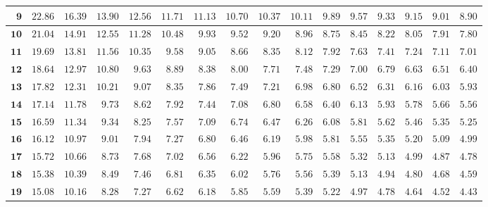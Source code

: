 \begin{alternateColorTable}
\begin{longtable}{|r|r|r|r|r|r|r|r|r|r|r|r|r|r|r|r|}
    \(\mathbf{9}\) & \(22.86\) & \(16.39\) & \(13.90\) & \(12.56\) & \(11.71\) & \(11.13\) & \(10.70\) & \(10.37\) & \(10.11\) & \(9.89\) & \(9.57\) & \(9.33\) & \(9.15\) & \(9.01\) & \(8.90\) \\ \hline 
    \(\mathbf{10}\) & \(21.04\) & \(14.91\) & \(12.55\) & \(11.28\) & \(10.48\) & \(9.93\) & \(9.52\) & \(9.20\) & \(8.96\) & \(8.75\) & \(8.45\) & \(8.22\) & \(8.05\) & \(7.91\) & \(7.80\) \\ \hline 
    \(\mathbf{11}\) & \(19.69\) & \(13.81\) & \(11.56\) & \(10.35\) & \(9.58\) & \(9.05\) & \(8.66\) & \(8.35\) & \(8.12\) & \(7.92\) & \(7.63\) & \(7.41\) & \(7.24\) & \(7.11\) & \(7.01\) \\ \hline 
    \(\mathbf{12}\) & \(18.64\) & \(12.97\) & \(10.80\) & \(9.63\) & \(8.89\) & \(8.38\) & \(8.00\) & \(7.71\) & \(7.48\) & \(7.29\) & \(7.00\) & \(6.79\) & \(6.63\) & \(6.51\) & \(6.40\) \\ \hline 
    \(\mathbf{13}\) & \(17.82\) & \(12.31\) & \(10.21\) & \(9.07\) & \(8.35\) & \(7.86\) & \(7.49\) & \(7.21\) & \(6.98\) & \(6.80\) & \(6.52\) & \(6.31\) & \(6.16\) & \(6.03\) & \(5.93\) \\ \hline 
    \(\mathbf{14}\) & \(17.14\) & \(11.78\) & \(9.73\) & \(8.62\) & \(7.92\) & \(7.44\) & \(7.08\) & \(6.80\) & \(6.58\) & \(6.40\) & \(6.13\) & \(5.93\) & \(5.78\) & \(5.66\) & \(5.56\) \\ \hline 
    \(\mathbf{15}\) & \(16.59\) & \(11.34\) & \(9.34\) & \(8.25\) & \(7.57\) & \(7.09\) & \(6.74\) & \(6.47\) & \(6.26\) & \(6.08\) & \(5.81\) & \(5.62\) & \(5.46\) & \(5.35\) & \(5.25\) \\ \hline 
    \(\mathbf{16}\) & \(16.12\) & \(10.97\) & \(9.01\) & \(7.94\) & \(7.27\) & \(6.80\) & \(6.46\) & \(6.19\) & \(5.98\) & \(5.81\) & \(5.55\) & \(5.35\) & \(5.20\) & \(5.09\) & \(4.99\) \\ \hline 
    \(\mathbf{17}\) & \(15.72\) & \(10.66\) & \(8.73\) & \(7.68\) & \(7.02\) & \(6.56\) & \(6.22\) & \(5.96\) & \(5.75\) & \(5.58\) & \(5.32\) & \(5.13\) & \(4.99\) & \(4.87\) & \(4.78\) \\ \hline 
    \(\mathbf{18}\) & \(15.38\) & \(10.39\) & \(8.49\) & \(7.46\) & \(6.81\) & \(6.35\) & \(6.02\) & \(5.76\) & \(5.56\) & \(5.39\) & \(5.13\) & \(4.94\) & \(4.80\) & \(4.68\) & \(4.59\) \\ \hline 
    \(\mathbf{19}\) & \(15.08\) & \(10.16\) & \(8.28\) & \(7.27\) & \(6.62\) & \(6.18\) & \(5.85\) & \(5.59\) & \(5.39\) & \(5.22\) & \(4.97\) & \(4.78\) & \(4.64\) & \(4.52\) & \(4.43\) \\ \hline 

\end{longtable}
\end{alternateColorTable}
